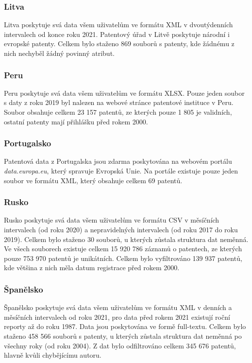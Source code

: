 \subsubsection{Litva}
Litva poskytuje svá data všem uživatelům ve formátu \gls{XML} v dvoutýdenních intervalech od konce roku 2021. Patentový úřad v Litvě poskytuje národní i evropské patenty. Celkem bylo staženo 869 souborů s patenty, kde žádnému z nich nechyběl žádný povinný atribut.

\subsubsection{Peru}
Peru poskytuje svá data všem uživatelům ve formátu XLSX. Pouze jeden soubor s daty z roku 2019 byl nalezen na webové stránce patentové instituce v Peru. Soubor obsahuje celkem 23 157 patentů, ze kterých pouze 1 805 je validních, ostatní patenty mají přihlášku před rokem 2000.

\subsubsection{Portugalsko}
Patentová data z Portugalska jsou zdarma poskytována na webovém portálu \textit{data.europa.eu}, který spravuje Evropská Unie. Na portále existuje pouze jeden soubor ve formátu \gls{XML}, který obsahuje celkem 69 patentů.

\subsubsection{Rusko}
Rusko poskytuje svá data všem uživatelům ve formátu \gls{CSV} v měsíčních intervalech (od roku 2020) a nepravidelných intervalech (od roku 2017 do roku 2019).
\newline
\indent Celkem bylo staženo 30 souborů, u kterých zůstala struktura dat neměnná. Ve všech souborech existuje celkem 15 920 786 záznamů o patentech, ze kterých pouze 753 970 patentů je unikátních. Celkem bylo vyfiltrováno 139 937 patentů, kde většina z nich měla datum registrace před rokem 2000.

\subsubsection{Španělsko}
Španělsko poskytuje svá data všem uživatelům ve formátu \gls{XML} v denních a měsíčních intervalech od roku 2021, pro data před rokem 2021 existují roční reporty až do roku 1987. Data jsou poskytována ve formě full-textu.
\newline
\indent Celkem bylo staženo 458 566 souborů s patenty, u kterých zůstala struktura dat neměnná po všechny roky (od roku 2004). Z dat bylo odfiltrováno celkem 345 676 patentů, hlavně kvůli chybějícímu autoru.

